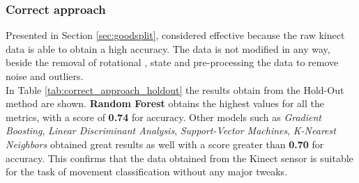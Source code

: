             \subsubsection{Correct approach}

                Presented in Section \ref{sec:goodsplit}, considered effective because the raw kinect data is able to obtain a high accuracy. The data is not modified in any way, beside the removal of rotational , state  and pre-processing the data to remove noise and outliers.\\
                 
                In Table \ref{tab:correct_approach_holdout} the results obtain from the Hold-Out method are shown. \textbf{Random Forest} obtains the highest values for all the metrics, with a score of \textbf{0.74} for accuracy. Other models such as \textit{Gradient Boosting}, \textit{Linear Discriminant Analysis}, \textit{Support-Vector Machines}, \textit{K-Nearest Neighbors} obtained great results as well with a score greater than \textbf{0.70} for accuracy. This confirms that the data obtained from the Kinect sensor is suitable for the task of movement classification without any major tweaks.\\
                
                \newpage

